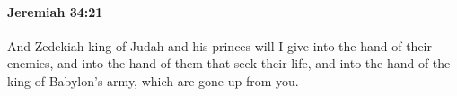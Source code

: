 
		\paragraph{Jeremiah 34:21} %
			\label{JEREMIAH-34-21}

			And Zedekiah king of Judah and his princes will I give into the hand of their enemies, and into the hand of them that seek their life, and into the hand of the king of Babylon’s army, which are gone up from you.



